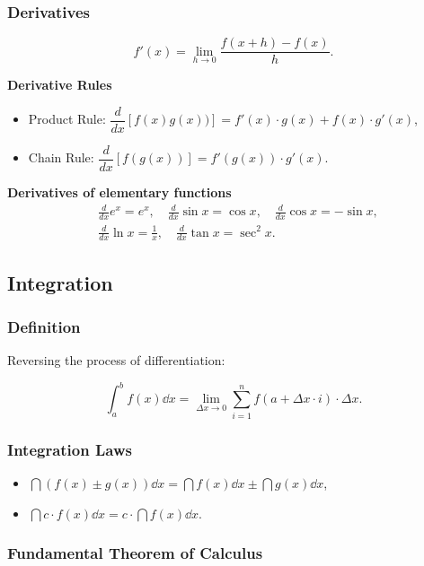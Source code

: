 \subsubsection{Derivatives}
\begin{defn}
    \[f'(x) = \lim_{h \to 0} \frac{f(x+h) - f(x)}{h}.\]
\end{defn}

\textbf{Derivative Rules}
\begin{itemize}
    \item Product Rule: $\dfrac{d}{dx} [f(x) g(x))] = f'(x) \cdot g(x) + f(x) \cdot g'(x)$,
    \item Chain Rule: $\dfrac{d}{dx} [f(g(x))] = f'(g(x)) \cdot g'(x)$.
\end{itemize}

\textbf{Derivatives of elementary functions}
\[
\begin{aligned}
    &\frac{d}{dx} e^x = e^x, \quad \frac{d}{dx} \sin x = \cos x, \quad \frac{d}{dx} \cos x = -\sin x, \\
    &\frac{d}{dx} \ln x = \frac{1}{x}, \quad \frac{d}{dx} \tan x = \sec^2 x.
\end{aligned}
\]

\newpage
\subsection{Integration}
\subsubsection{Definition}
Reversing the process of differentiation:
\begin{defn}
    \[\int_a^b f(x) \dd x = \lim_{\Delta x \to 0} \sum_{i=1}^n f(a + \Delta x \cdot i) \cdot \Delta x.\]
\end{defn}

\subsubsection{Integration Laws}
\begin{itemize}
    \item $\dint (f(x) \pm g(x)) \dd x = \dint f(x) \dd x \pm \dint g(x) \dd x$,
    \item $\dint c \cdot f(x) \dd x = c \cdot \dint f(x) \dd x$.
\end{itemize}

\subsubsection{Fundamental Theorem of Calculus}

